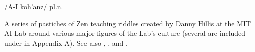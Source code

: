  /A-I koh'anz/ pl.n.

A series of pastiches of Zen teaching riddles created by Danny Hillis at the MIT AI Lab around various major figures of the Lab's culture
(several are included under  in Appendix A). See also , , and
.

